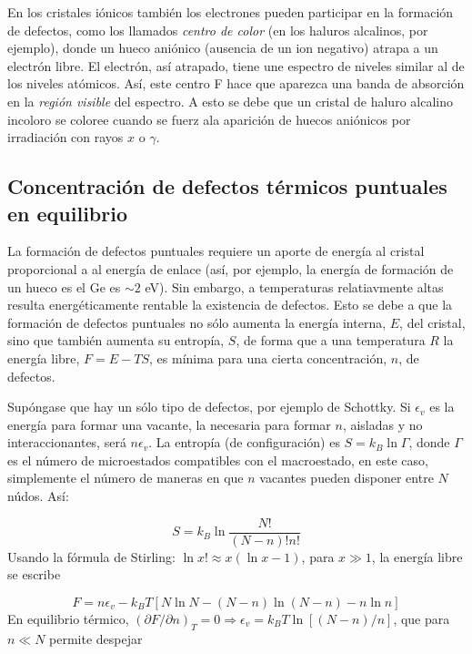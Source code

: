 En los cristales iónicos también los electrones pueden participar en la formación de defectos, como los llamados {\it centro de color} (en los haluros alcalinos, por ejemplo), donde un hueco aniónico (ausencia de un ion negativo) atrapa a un electrón libre. El electrón, así atrapado, tiene une espectro de niveles similar al de los niveles atómicos. Así, este centro F hace que aparezca una banda de absorción en la {\it región visible} del espectro. A esto se debe que un cristal de haluro alcalino incoloro se coloree cuando se fuerz ala aparición de huecos aniónicos por irradiación con rayos $x$ o $\gamma$.


\subsection{Concentración de defectos térmicos puntuales en equilibrio} \label{Subsec:01-06-02}

La formación de defectos puntuales requiere un aporte de energía al cristal proporcional a al energía de enlace (así, por ejemplo, la energía de formación de un hueco es el Ge es $\sim 2$ eV). Sin embargo, a temperaturas relatiavmente altas resulta energéticamente rentable la existencia de defectos. Esto se debe a que la formación de defectos puntuales no sólo aumenta la energía interna, $E$, del cristal, sino que también aumenta su entropía, $S$, de forma que a una temperatura $R$ la energía libre, $F=E-TS$, es mínima para una cierta concentración, $n$, de defectos. 

Supóngase que hay un sólo tipo de defectos, por ejemplo de Schottky. Si $\epsilon_v$ es la energía para formar una vacante, la necesaria para formar $n$, aisladas y no interaccionantes, será $n\epsilon_v$. La entropía (de configuración) es $S=k_B \ln \Gamma$, donde $\Gamma$ es el número de microestados compatibles con el macroestado, en este caso, simplemente el número de maneras en que $n$ vacantes pueden disponer entre $N$ núdos. Así:

\begin{equation}
    S = k_B \ln \frac{N!}{(N-n)! n!}
\end{equation}
Usando la fórmula de Stirling: $\ln x! \approx x(\ln x - 1)$, para $x\gg 1$, la energía libre se escribe

\begin{equation}
    F = n \epsilon_v - k_B T [N \ln N - (N-n) \ln (N-n) - n \ln n]
\end{equation}
En equilibrio térmico, $(\partial F / \partial n)_T = 0 \Rightarrow \epsilon_v = k_B T \ln [(N-n)/n]$, que para $n\ll  N$ permite despejar

